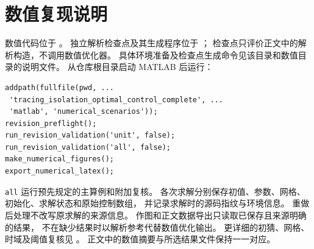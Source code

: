 \section{数值复现说明}
\label{app:numerical-reproducibility}

数值代码位于 。
独立解析检查点及其生成程序位于
；
检查点只评价正文中的解析构造，不调用数值优化器。
具体环境准备及检查点生成命令见该目录和数值目录的说明文件。
从仓库根目录启动 MATLAB 后运行：
\begin{lstlisting}
addpath(fullfile(pwd, ...
 'tracing_isolation_optimal_control_complete', ...
 'matlab', 'numerical_scenarios'));
revision_preflight();
run_revision_validation('unit', false);
run_revision_validation('all', false);
make_numerical_figures();
export_numerical_latex();
\end{lstlisting}

\texttt{all} 运行预先规定的主算例和附加复核。
各次求解分别保存初值、参数、网格、初始化、求解状态和原始控制数组，
并记录求解时的源码指纹与环境信息。
重做后处理不改写原求解的来源信息。
作图和正文数据导出只读取已保存且来源明确的结果，
不在缺少结果时以解析参考代替数值优化输出。
更详细的初猜、网格、时域及阈值复核见
。
正文中的数值摘要与所选结果文件保持一一对应。
